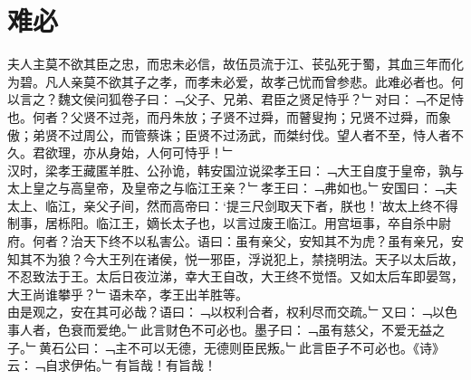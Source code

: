 \chapter{难必}%
夫人主莫不欲其臣之忠，而忠未必信，故伍员流于江、苌弘死于蜀，其血三年而化为碧。凡人亲莫不欲其子之孝，而孝未必爱，故孝己忧而曾参悲。此难必者也。何以言之？魏文侯问狐卷子曰：﹁父子、兄弟、君臣之贤足恃乎？﹂对曰：﹁不足恃也。何者？父贤不过尧，而丹朱放；子贤不过舜，而瞽叟拘；兄贤不过舜，而象傲；弟贤不过周公，而管蔡诛；臣贤不过汤武，而桀纣伐。望人者不至，恃人者不久。君欲理，亦从身始，人何可恃乎！﹂\\
汉时，梁孝王藏匿羊胜、公孙诡，韩安国泣说梁孝王曰：﹁大王自度于皇帝，孰与太上皇之与高皇帝，及皇帝之与临江王亲？﹂孝王曰：﹁弗如也。﹂安国曰：﹁夫太上、临江，亲父子间，然而高帝曰：‘提三尺剑取天下者，朕也！’故太上终不得制事，居栎阳。临江王，嫡长太子也，以言过废王临江。用宫垣事，卒自杀中尉府。何者？治天下终不以私害公。语曰：虽有亲父，安知其不为虎？虽有亲兄，安知其不为狼？今大王列在诸侯，悦一邪臣，浮说犯上，禁挠明法。天子以太后故，不忍致法于王。太后日夜泣涕，幸大王自改，大王终不觉悟。又如太后车即晏驾，大王尚谁攀乎？﹂语未卒，孝王出羊胜等。\\
由是观之，安在其可必哉？语曰：﹁以权利合者，权利尽而交疏。﹂又曰：﹁以色事人者，色衰而爱绝。﹂此言财色不可必也。墨子曰：﹁虽有慈父，不爱无益之子。﹂黄石公曰：﹁主不可以无德，无德则臣民叛。﹂此言臣子不可必也。《诗》云：﹁自求伊佑。﹂有旨哉！有旨哉！
%
%
